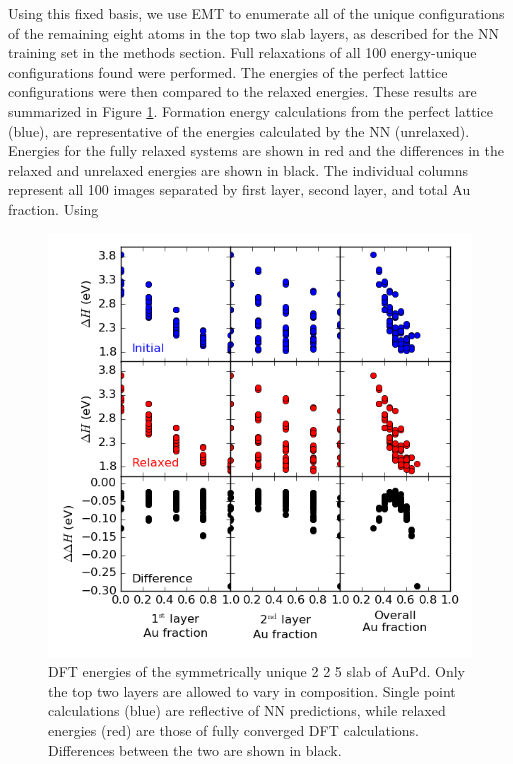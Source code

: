 \documentclass[12pt]{cmuthesis}
\begin{document}
Using this fixed basis, we use EMT to enumerate all of the unique configurations of the remaining eight atoms in the top two slab layers, as described for the NN training set in the methods section. Full relaxations of all 100 energy-unique configurations found were performed. The energies of the perfect lattice configurations were then compared to the relaxed energies. These results are summarized in Figure \ref{fig-DFT-segregation}. Formation energy calculations from the perfect lattice (blue), are representative of the energies calculated by the NN (unrelaxed). Energies for the fully relaxed systems are shown in red and the differences in the relaxed and unrelaxed energies are shown in black. The individual columns represent all 100 images separated by first layer, second layer, and total Au fraction. Using

\begin{figure}[h]
\centering
\includegraphics[width=5in]{./images/DFT-segregation.png}
\caption{\label{fig-DFT-segregation}
DFT energies of the symmetrically unique 2 \texttimes{} 2 \texttimes{} 5 slab of AuPd. Only the top two layers are allowed to vary in composition. Single point calculations (blue) are reflective of NN predictions, while relaxed energies (red) are those of fully converged DFT calculations. Differences between the two are shown in black.}
\end{figure}
\end{document}
